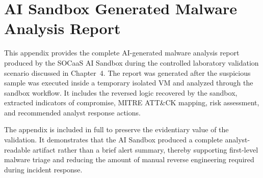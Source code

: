 \chapter{AI Sandbox Generated Malware Analysis Report}
\label{app:ai-sandbox-report}

This appendix provides the complete AI-generated malware analysis report produced by the SOCaaS AI Sandbox during the controlled laboratory validation scenario discussed in Chapter~4. The report was generated after the suspicious sample was executed inside a temporary isolated VM and analyzed through the sandbox workflow. It includes the reversed logic recovered by the sandbox, extracted indicators of compromise, MITRE ATT\&CK mapping, risk assessment, and recommended analyst response actions.

The appendix is included in full to preserve the evidentiary value of the validation. It demonstrates that the AI Sandbox produced a complete analyst-readable artifact rather than a brief alert summary, thereby supporting first-level malware triage and reducing the amount of manual reverse engineering required during incident response.



